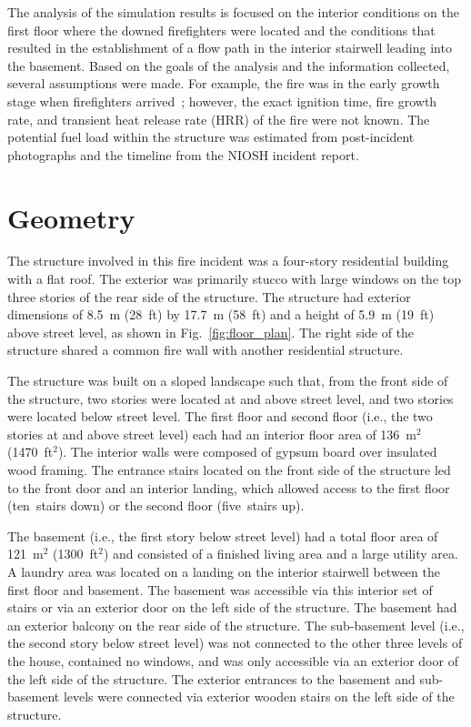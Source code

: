 \documentclass[12pt,oneside]{book}
\begin{document}
\clearpage


The analysis of the simulation results is focused on the interior conditions on the first floor where the downed firefighters were located and the conditions that resulted in the establishment of a flow path in the interior stairwell leading into the basement. Based on the goals of the analysis and the information collected, several assumptions were made. For example, the fire was in the early growth stage when firefighters arrived~\cite{NIOSH:Bowyer2}; however, the exact ignition time, fire growth rate, and transient heat release rate (HRR) of the fire were not known. The potential fuel load within the structure was estimated from post-incident photographs and the timeline from the NIOSH incident report.

\section{Geometry}
\label{sec:geometry}

The structure involved in this fire incident was a four-story residential building with a flat roof. The exterior was primarily stucco with large windows on the top three stories of the rear side of the structure. The structure had exterior dimensions of 8.5~m (28~ft) by 17.7~m (58~ft) and a height of 5.9~m (19~ft) above street level, as shown in Fig.~\ref{fig:floor_plan}. The right side of the structure shared a common fire wall with another residential structure.

The structure was built on a sloped landscape such that, from the front side of the structure, two stories were located at and above street level, and two stories were located below street level. The first floor and second floor (i.e., the two stories at and above street level) each had an interior floor area of 136~m$^2$ (1470~ft$^2$). The interior walls were composed of gypsum board over insulated wood framing. The entrance stairs located on the front side of the structure led to the front door and an interior landing, which allowed access to the first floor (ten~stairs down) or the second floor (five~stairs up).

The basement (i.e., the first story below street level) had a total floor area of 121~m$^2$ (1300~ft$^2$) and consisted of a finished living area and a large utility area. A laundry area was located on a landing on the interior stairwell between the first floor and basement. The basement was accessible via this interior set of stairs or via an exterior door on the left side of the structure. The basement had an exterior balcony on the rear side of the structure. The sub-basement level (i.e., the second story below street level) was not connected to the other three levels of the house, contained no windows, and was only accessible via an exterior door of the left side of the structure. The exterior entrances to the basement and sub-basement levels were connected via exterior wooden stairs on the left side of the structure.
\end{document}
